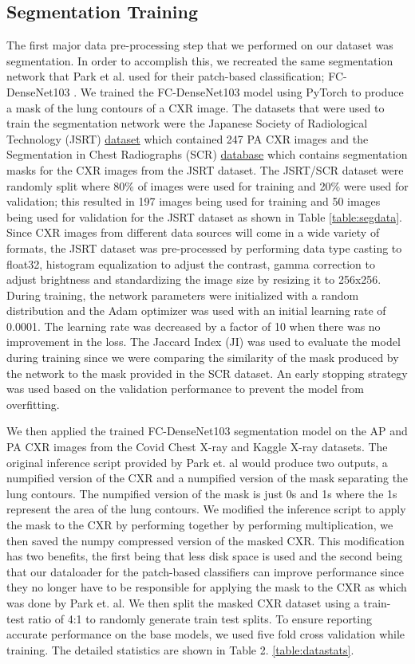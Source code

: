 \documentclass{sigkddExp}
\begin{document}
\subsection{Segmentation Training}
The first major data pre-processing step that we performed on our dataset was
segmentation. In order to accomplish this, we recreated the same segmentation
network that Park et al. used for their patch-based classification;
FC-DenseNet103 \cite{DBLP:journals/corr/JegouDVRB16}. We trained the
FC-DenseNet103 model using PyTorch to produce a mask of the lung contours of a
CXR image. The datasets that were used to train the segmentation network were
the Japanese Society of Radiological Technology (JSRT)
\href{http://db.jsrt.or.jp/eng.php}{dataset} which contained 247 PA CXR images
and the Segmentation in Chest Radiographs (SCR)
\href{https://www.isi.uu.nl/Research/Databases/SCR/}{database} which contains
segmentation masks for the CXR images from the JSRT dataset. The JSRT/SCR
dataset were randomly split where 80\% of images were used for training and 20\%
were used for validation; this resulted in 197 images being used for training
and 50 images being used for validation for the JSRT dataset as shown in Table
\ref{table:segdata}. Since CXR images from different data sources will come in a
wide variety of formats, the JSRT dataset was pre-processed by performing data
type casting to float32, histogram equalization to adjust the contrast, gamma
correction to adjust brightness and standardizing the image size by resizing it
to 256x256. During training, the network parameters were initialized with a
random distribution and the Adam optimizer was used with an initial learning
rate of 0.0001. The learning rate was decreased by a factor of 10 when there was
no improvement in the loss. The Jaccard Index (JI) was used to evaluate the
model during training since we were comparing the similarity of the mask
produced by the network to the mask provided in the SCR dataset. An early
stopping strategy was used based on the validation performance to prevent the
model from overfitting.

We then applied the trained FC-DenseNet103 segmentation model on the AP and PA CXR images from the Covid Chest X-ray and Kaggle X-ray datasets. The original inference script provided by Park et. al would produce two outputs, a numpified version of the CXR and a numpified version of the mask separating the lung contours. The numpified version of the mask is just 0s and 1s where the 1s represent the area of the lung contours.  We modified the inference script to apply the mask to the CXR by performing together by performing multiplication, we then saved the numpy compressed version of the masked CXR. This modification has two benefits, the first being that less disk space is used and the second being that our dataloader for the patch-based classifiers can improve performance since they no longer have to be responsible for applying the mask to the CXR as which was done by Park et. al. We then split the masked CXR dataset using a train-test ratio of 4:1 to randomly generate train test splits. To ensure reporting accurate performance on the base models, we used five fold cross validation while training. The detailed statistics are shown in Table 2.
\ref{table:datastats}.
\end{document}
